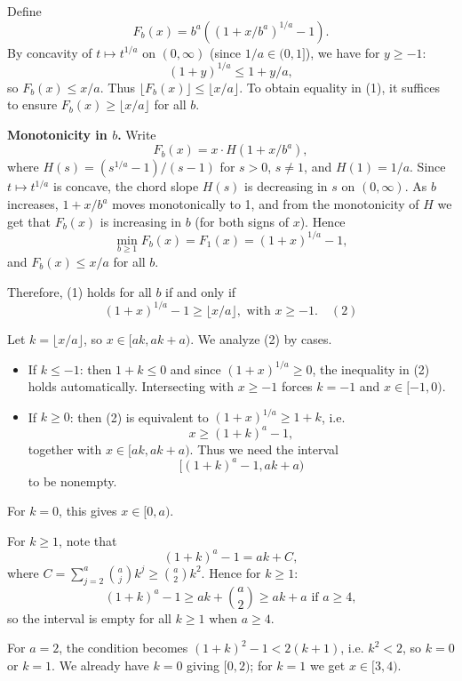 \documentclass[12pt,a4paper]{article}
\theoremstyle{definition}
\begin{document}
    Define
    $$F_b(x) = b^a((1 + x/b^a)^{1/a} - 1).$$
    By concavity of $t \mapsto t^{1/a}$ on $(0,\infty)$ (since $1/a \in (0,1]$), we have for $y \geq -1$:
    $$(1 + y)^{1/a} \leq 1 + y/a,$$
    so $F_b(x) \leq x/a$. Thus $\lfloor F_b(x) \rfloor \leq \lfloor x/a \rfloor$. To obtain equality in (1), it suffices to ensure $F_b(x) \geq \lfloor x/a \rfloor$ for all $b$.

    \textbf{Monotonicity in $b$.} Write
    $$F_b(x) = x \cdot H(1 + x/b^a),$$
    where $H(s) = (s^{1/a} - 1)/(s - 1)$ for $s > 0$, $s \neq 1$, and $H(1) = 1/a$.
    Since $t \mapsto t^{1/a}$ is concave, the chord slope $H(s)$ is decreasing in $s$ on $(0,\infty)$. As $b$ increases, $1 + x/b^a$ moves monotonically to 1, and from the monotonicity of $H$ we get that $F_b(x)$ is increasing in $b$ (for both signs of $x$). Hence
    $$\min_{b\geq 1} F_b(x) = F_1(x) = (1 + x)^{1/a} - 1,$$
    and $F_b(x) \leq x/a$ for all $b$.

    Therefore, (1) holds for all $b$ if and only if
    $$(1 + x)^{1/a} - 1 \geq \lfloor x/a \rfloor, \text{ with } x \geq -1. \quad (2)$$

    Let $k = \lfloor x/a \rfloor$, so $x \in [ak, ak + a)$. We analyze (2) by cases.

    \begin{itemize}
        \item If $k \leq -1$: then $1 + k \leq 0$ and since $(1 + x)^{1/a} \geq 0$, the inequality in (2) holds automatically. Intersecting with $x \geq -1$ forces $k = -1$ and $x \in [-1, 0)$.

        \item If $k \geq 0$: then (2) is equivalent to $(1 + x)^{1/a} \geq 1 + k$, i.e.
        $$x \geq (1 + k)^a - 1,$$
        together with $x \in [ak, ak + a)$. Thus we need the interval
        $$[(1 + k)^a - 1, ak + a)$$
        to be nonempty.
    \end{itemize}

    For $k = 0$, this gives $x \in [0, a)$.

    For $k \geq 1$, note that
    $$(1 + k)^a - 1 = ak + C,$$
    where $C = \sum_{j=2}^a \binom{a}{j} k^j \geq \binom{a}{2} k^2$.
    Hence for $k \geq 1$:
    $$(1 + k)^a - 1 \geq ak + \binom{a}{2} \geq ak + a \text{ if } a \geq 4,$$
    so the interval is empty for all $k \geq 1$ when $a \geq 4$.

    For $a = 2$, the condition becomes $(1 + k)^2 - 1 < 2(k + 1)$, i.e. $k^2 < 2$, so $k = 0$ or $k = 1$. We already have $k = 0$ giving $[0, 2)$; for $k = 1$ we get $x \in [3, 4)$.
\end{document}
